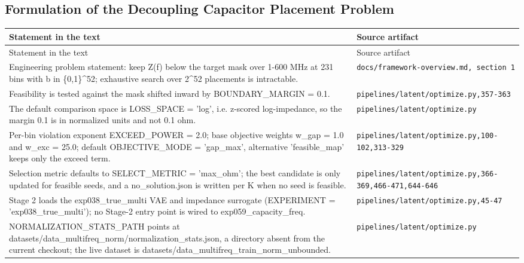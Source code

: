 \subsection*{Formulation of the Decoupling Capacitor Placement Problem}
\begingroup\small
\begin{longtable}{p{} p{}}
\hline
Statement in the text & Source artifact \\
\hline
\endfirsthead
\hline
Statement in the text & Source artifact \\
\hline
\endhead
Engineering problem statement: keep Z(f) below the target mask over 1-600 MHz at 231 bins with b in \{0,1\}\textasciicircum{}52; exhaustive search over 2\textasciicircum{}52 placements is intractable. & \texttt{docs/\allowbreak{}framework-overview.md, section 1} \\
Feasibility is tested against the mask shifted inward by BOUNDARY\_MARGIN = 0.1. & \texttt{pipelines/\allowbreak{}latent/\allowbreak{}optimize.py,357-363} \\
The default comparison space is LOSS\_SPACE = 'log', i.e. z-scored log-impedance, so the margin 0.1 is in normalized units and not 0.1 ohm. & \texttt{pipelines/\allowbreak{}latent/\allowbreak{}optimize.py} \\
Per-bin violation exponent EXCEED\_POWER = 2.0; base objective weights w\_gap = 1.0 and w\_exc = 25.0; default OBJECTIVE\_MODE = 'gap\_max', alternative 'feasible\_map' keeps only the exceed term. & \texttt{pipelines/\allowbreak{}latent/\allowbreak{}optimize.py,100-102,313-329} \\
Selection metric defaults to SELECT\_METRIC = 'max\_ohm'; the best candidate is only updated for feasible seeds, and a no\_solution.json is written per K when no seed is feasible. & \texttt{pipelines/\allowbreak{}latent/\allowbreak{}optimize.py,366-369,466-471,644-646} \\
Stage 2 loads the exp038\_true\_multi VAE and impedance surrogate (EXPERIMENT = 'exp038\_true\_multi'); no Stage-2 entry point is wired to exp059\_capacity\_freq. & \texttt{pipelines/\allowbreak{}latent/\allowbreak{}optimize.py,45-47} \\
NORMALIZATION\_STATS\_PATH points at datasets/data\_multifreq\_norm/normalization\_stats.json, a directory absent from the current checkout; the live dataset is datasets/data\_multifreq\_train\_norm\_unbounded. & \texttt{pipelines/\allowbreak{}latent/\allowbreak{}optimize.py} \\
\hline
\end{longtable}
\endgroup

